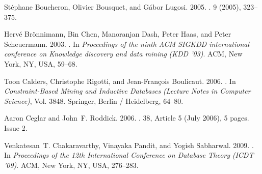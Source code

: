 \begin{thebibliography}{00}
{St\'{e}phane Boucheron}, {Olivier Bousquet}, {and} {G\'{a}bor Lugosi}. 2005.
\newblock {}.
  {9} (2005), 323--375.


{Herv\'{e} Br\"{o}nnimann}, {Bin Chen}, {Manoranjan Dash}, {Peter Haas}, {and}
  {Peter Scheuermann}. 2003.
\newblock {}. In {\em
  Proceedings of the ninth ACM SIGKDD international conference on Knowledge
  discovery and data mining} {\em (KDD '03)}. ACM, New York, NY, USA, 59--68.
\newblock


{Toon Calders}, {Christophe Rigotti}, {and} {Jean-Fran{\c c}ois Boulicaut}.
  2006.
\newblock {}. In {\em Constraint-Based Mining and Inductive Databases} {\em (Lecture
  Notes in Computer Science)}, Vol. 3848. Springer, Berlin / Heidelberg,
  64--80.
\newblock
{}


{Aaron Ceglar} {and} {John~F. Roddick}. 2006.
\newblock {}.
  {38}, Article 5 (July 2006), 5 pages.
\newblock
Issue 2.


{Venkatesan~T. Chakaravarthy}, {Vinayaka Pandit}, {and} {Yogish Sabharwal}.
  2009.
\newblock {}. In {\em Proceedings of the 12th International Conference on
  Database Theory} {\em (ICDT '09)}. ACM, New York, NY, USA, 276--283.



\end{thebibliography}
